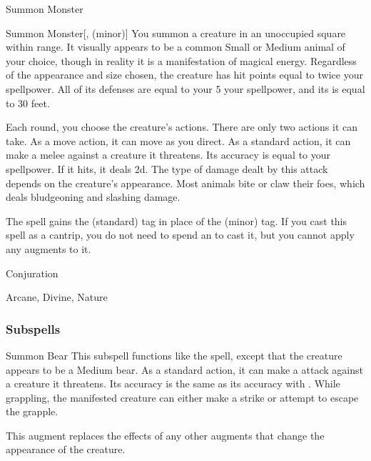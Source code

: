 \newpage
\begin{spellsection}{Summon Monster}

\begin{spellheader}
\end{spellheader}


\begin{ability}{Summon Monster}[,  (minor)]
You summon a creature in an unoccupied square within \rngmed range.
It visually appears to be a common Small or Medium animal of your choice, though in reality it is a manifestation of magical energy.
Regardless of the appearance and size chosen, the creature has hit points equal to twice your spellpower.
All of its defenses are equal to your 5 \add your spellpower, and its  is equal to 30 feet.

Each round, you choose the creature's actions.
There are only two actions it can take.
As a move action, it can move as you direct.
As a standard action, it can make a melee  against a creature it threatens.
Its accuracy is equal to your spellpower.
If it hits, it deals  \minus2d.
The type of damage dealt by this attack depends on the creature's appearance.
Most animals bite or claw their foes, which deals bludgeoning and slashing damage.
\end{ability}



 The spell gains the  (standard) tag in place of the  (minor) tag. If you cast this spell as a cantrip,
you do not need to spend an  to cast it,
but you cannot apply any augments to it.


 Conjuration

 Arcane, Divine, Nature
\end{spellsection}


\subsubsection{Subspells}


\begin{ability}[\nth{2}]{Summon Bear}
This subspell functions like the  spell, except that the creature appears to be a Medium bear.
As a standard action, it can make a  attack against a creature it threatens.
Its accuracy is the same as its accuracy with .
While grappling, the manifested creature can either make a strike or attempt to escape the grapple.

This augment replaces the effects of any other augments that change the appearance of the creature.
\end{ability}
\vspace{0.25em}

